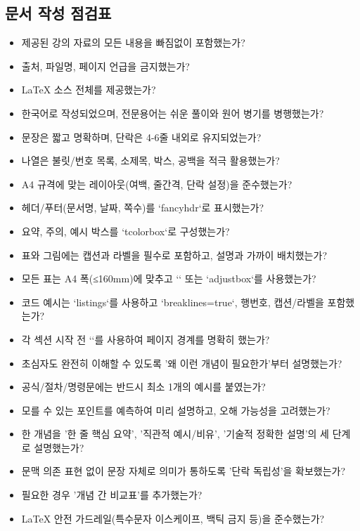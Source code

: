 \documentclass[11pt,a4paper]{article}
\begin{document}
\subsection{문서 작성 점검표}
\begin{itemize}
    \item 제공된 강의 자료의 모든 내용을 빠짐없이 포함했는가?
    \item 출처, 파일명, 페이지 언급을 금지했는가?
    \item LaTeX 소스 전체를 제공했는가?
    \item 한국어로 작성되었으며, 전문용어는 쉬운 풀이와 원어 병기를 병행했는가?
    \item 문장은 짧고 명확하며, 단락은 4-6줄 내외로 유지되었는가?
    \item 나열은 불릿/번호 목록, 소제목, 박스, 공백을 적극 활용했는가?
    \item A4 규격에 맞는 레이아웃(여백, 줄간격, 단락 설정)을 준수했는가?
    \item 헤더/푸터(문서명, 날짜, 쪽수)를 `fancyhdr`로 표시했는가?
    \item 요약, 주의, 예시 박스를 `tcolorbox`로 구성했는가?
    \item 표와 그림에는 캡션과 라벨을 필수로 포함하고, 설명과 가까이 배치했는가?
    \item 모든 표는 A4 폭(≤160mm)에 맞추고 `\resizebox` 또는 `adjustbox`를 사용했는가?
    \item 코드 예시는 `listings`를 사용하고 `breaklines=true`, 행번호, 캡션/라벨을 포함했는가?
    \item 각 섹션 시작 전 `\newpage`를 사용하여 페이지 경계를 명확히 했는가?
    \item 초심자도 완전히 이해할 수 있도록 '왜 이런 개념이 필요한가'부터 설명했는가?
    \item 공식/절차/명령문에는 반드시 최소 1개의 예시를 붙였는가?
    \item 모를 수 있는 포인트를 예측하여 미리 설명하고, 오해 가능성을 고려했는가?
    \item 한 개념을 '한 줄 핵심 요약', '직관적 예시/비유', '기술적 정확한 설명'의 세 단계로 설명했는가?
    \item 문맥 의존 표현 없이 문장 자체로 의미가 통하도록 '단락 독립성'을 확보했는가?
    \item 필요한 경우 '개념 간 비교표'를 추가했는가?
    \item LaTeX 안전 가드레일(특수문자 이스케이프, 백틱 금지 등)을 준수했는가?
\end{itemize}
\end{document}
